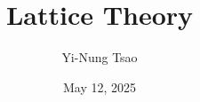 \documentclass[12pt,oneside]{article}
\title{Lattice Theory}
\author{Yi-Nung Tsao}
\date{May 12, 2025}
\begin{document}
\theoremstyle{plain}
\newtheorem{proposition}{Proposition}

\maketitle
\tableofcontents
\newpage




\end{document}
